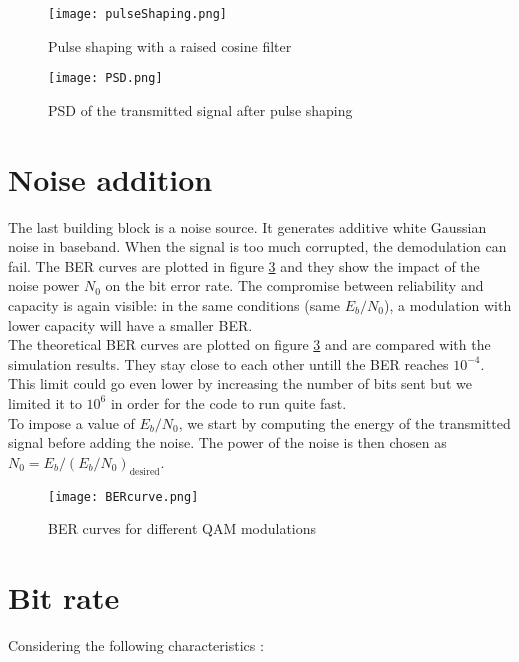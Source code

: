 \begin{figure}[H]
    \centering
    \texttt{[image: pulseShaping.png]}
    \caption{Pulse shaping with a raised cosine filter}
    \label{fig:pulseShaping}
\end{figure}

\begin{figure}[H]
    \centering
    \texttt{[image: PSD.png]}
    \caption{PSD of the transmitted signal after pulse shaping}
    \label{fig:psd}
\end{figure}

\section{Noise addition}

The last building block is a noise source. It generates additive white Gaussian noise in baseband. When the signal is too much corrupted, the demodulation can fail. The BER curves are plotted in figure \ref{fig:BER} and they show the impact of the noise power $N_0$ on the bit error rate. The compromise between reliability and capacity is again visible: in the same conditions (same $E_b/N_0$), a modulation with lower capacity will have a smaller BER. \\

The theoretical BER curves are plotted on figure \ref{fig:BER} and are compared with the simulation results. They stay close to each other untill the BER reaches $10^{-4}$. This limit could go even lower by increasing the number of bits sent but we limited it to $10^6$ in order for the code to run quite fast. \\

To impose a value of $E_b/N_0$, we start by computing the energy of the transmitted signal before adding the noise. The power of the noise is then chosen as $N_0 = E_b / (E_b/N_0)_{\text{desired}}$. \\

\begin{figure}[H]
    \centering
    \texttt{[image: BERcurve.png]}
    \caption{BER curves for different QAM modulations}
    \label{fig:BER}
\end{figure}

\section{Bit rate}

Considering the following characteristics :

